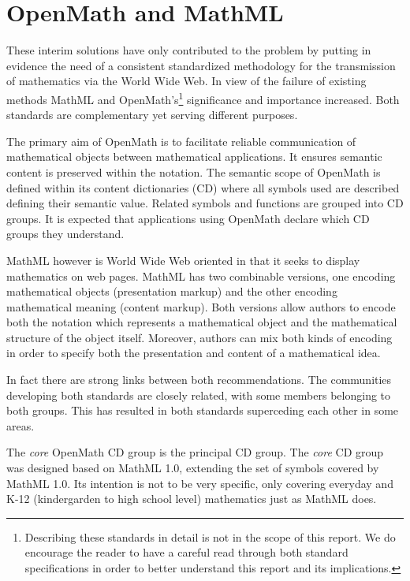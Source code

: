 \section{OpenMath and MathML}

These interim solutions have only contributed to the problem by putting in evidence the need of a consistent standardized methodology for the
transmission of mathematics via the World Wide Web. In view of the failure of existing methods MathML and OpenMath's\footnote{Describing these
standards in detail is not in the scope of this report. We do encourage the reader to have a careful read through both standard specifications
\cite{openmath}\cite{mathml} in order to better understand this report and its implications.} significance and importance increased. Both standards
are complementary yet serving different purposes.

The primary aim of OpenMath is to facilitate reliable communication of mathematical objects between mathematical applications. It
ensures semantic content is preserved within the notation. The semantic scope of OpenMath is defined within its content
dictionaries (CD) where all symbols used are described defining their semantic value. Related symbols and functions are
grouped into CD groups. It is expected that applications using OpenMath declare which CD groups they understand.

MathML however is World Wide Web oriented in that it seeks to display mathematics on web pages.
MathML has two combinable versions, one encoding mathematical objects (presentation
markup) and the other encoding mathematical meaning (content markup). Both versions allow authors to encode both the notation which represents a mathematical object and the
mathematical structure of the object itself. Moreover, authors can mix both kinds of encoding in order to specify both the
presentation and content of a mathematical idea.

In fact there are strong links between both recommendations. The communities developing both standards are closely
related, with some members belonging to both groups. This has resulted in both standards superceding each other in some
areas.

The {\it core} OpenMath CD group is the principal CD group. The {\it core} CD group was designed based on
MathML 1.0, extending the set of symbols covered by MathML 1.0. Its
intention is not to be very specific, only covering everyday and K-12 (kindergarden to high school level) mathematics just
as MathML does.

